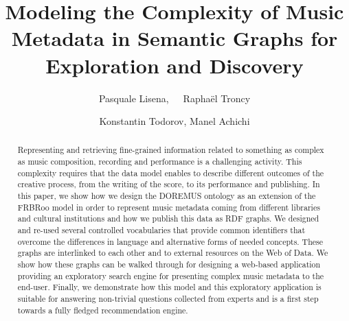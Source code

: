 \documentclass[sigconf]{acmart}
\begin{document}
\title{Modeling the Complexity of Music Metadata in Semantic Graphs for Exploration and Discovery}

\author{Pasquale Lisena,~~~Rapha\"el Troncy}

\author{Konstantin Todorov, Manel Achichi}


\renewcommand{\shortauthors}{P. Lisena et al.}
\renewcommand{\shorttitle}{Modeling the Complexity of Music Metadata in Semantic Graphs}


\begin{abstract}
Representing and retrieving fine-grained information related to something as complex as music composition, recording and performance is a challenging activity. This complexity requires that the data model enables to describe different outcomes of the creative process, from the writing of the score, to its performance and publishing. In this paper, we show how we design the DOREMUS ontology as an extension of the FRBRoo model in order to represent music metadata coming from different libraries and cultural institutions and how we publish this data as RDF graphs. We designed and re-used several controlled vocabularies that provide common identifiers that overcome the differences in language and alternative forms of needed concepts. These graphs are interlinked to each other and to external resources on the Web of Data. We show how these graphs can be walked through for designing a web-based application providing an exploratory search engine for presenting complex music metadata to the end-user. Finally, we demonstrate how this model and this exploratory application is suitable for answering non-trivial questions collected from experts and is a first step towards a fully fledged recommendation engine.
\end{abstract}
\end{document}
